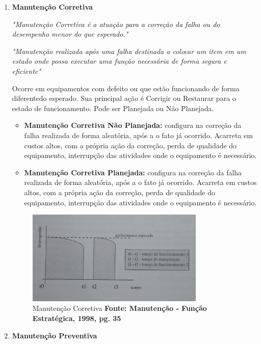 \begin{enumerate}
	\item \textbf{Manutenção Corretiva}

		\emph{"Manutenção Corretiva é a atuação para a correção da falha ou do desempenho menor do que esperado."} \cite{kardecnascif2010}

		\emph{"Manutenção realizada após uma falha destinada a colocar um item em um estado onde possa executar uma função necessária de forma segura e eficiente"} \cite{british1993bs}

		Ocorre em equipamentos com defeito ou que estão funcionando de forma diferentedo esperado. Sua principal ação é Corrigir ou Restaurar para o estado de funcionamento. Pode ser Planejada ou Não Planejada.

		\begin{itemize}
			\item \textbf{Manutenção Corretiva Não Planejada:} configura na correção da falha realizada de forma aleatória, após a o fato já ocorrido. Acarreta em custos altos, com a própria ação da correção, perda de qualidade do equipamento, interrupção das atividades onde o equipamento é necessário.
			\item \textbf{Manutenção Corretiva Planejada:} configura na correção da falha realizada de forma aleatória, após a o fato já ocorrido. Acarreta em custos altos, com a própria ação da correção, perda de qualidade do equipamento, interrupção das atividades onde o equipamento é necessário.
		\end{itemize}

		\graphicspath{{figuras/}}
		\begin{figure}[h]
		\centering
		\includegraphics[width=0.8\textwidth]{corretiva}
		\caption{Manutenção Corretiva \textbf{Fonte: Manutenção - Função Estratégica, 1998, pg. 35}}
		\label{corretiva}
		\end{figure}

	\item \textbf{Manutenção Preventiva}


\end{enumerate}
